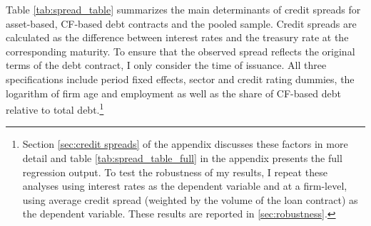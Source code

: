 \documentclass[12pt]{article}
\begin{document}
Table \ref{tab:spread_table} summarizes the main determinants of credit spreads for asset-based, CF-based debt contracts and the pooled sample. Credit spreads are calculated as the difference between interest rates and the treasury rate at the corresponding maturity. To ensure that the observed spread reflects the original terms of the debt contract, I only consider the time of issuance. All three specifications include period fixed effects, sector and credit rating dummies, the logarithm of firm age and employment as well as the share of CF-based debt relative to total debt.\footnote{Section \ref{sec:credit spreads} of the appendix discusses these factors in more detail and table \ref{tab:spread_table_full} in the appendix presents the full regression output. To test the robustness of my results, I repeat these analyses using interest rates as the dependent variable and at a firm-level, using average credit spread (weighted by the volume of the loan contract) as the dependent variable. These results are reported in \ref{sec:robustness}.}
\end{document}
